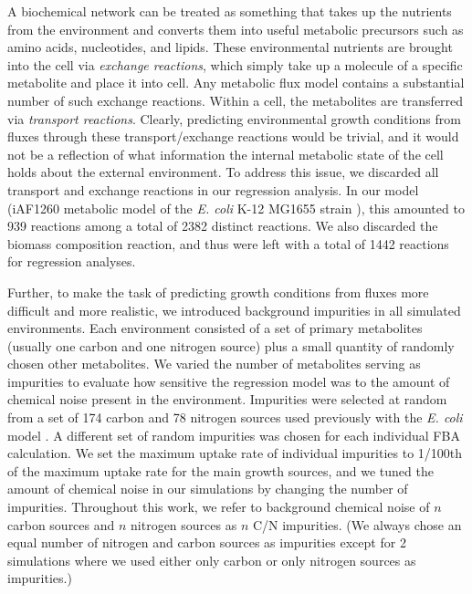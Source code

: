 \documentclass[12pt]{article}
\begin{document}
A biochemical network can be treated as something that takes up the nutrients from the environment and converts them into useful metabolic precursors such as amino acids, nucleotides, and lipids. These environmental nutrients are brought into the cell via \emph{exchange reactions}, which simply take up a molecule of a specific metabolite and place it into cell. Any metabolic flux model contains a substantial number of such exchange reactions. Within a cell, the metabolites are transferred via \emph{transport reactions}. Clearly, predicting environmental growth conditions from fluxes through these transport/exchange reactions would be trivial, and it would not be a reflection of what information the internal metabolic state of the cell holds about the external environment. To address this issue, we discarded all transport and exchange reactions in our regression analysis. In our model (iAF1260 metabolic model of the \emph{E. coli} K-12 MG1655 strain \cite{Schellenbergeretal2010}), this amounted to 939 reactions among a total of 2382 distinct reactions. We also discarded the biomass composition reaction, and thus were left with a total of 1442 reactions for regression analyses.

Further, to make the task of predicting growth conditions from fluxes more difficult and more realistic, we introduced background impurities in all simulated environments. Each environment consisted of a set of primary metabolites (usually one carbon and one nitrogen source) plus a small quantity of randomly chosen other metabolites. We varied the number of metabolites serving as impurities to evaluate how sensitive the regression model was to the amount of chemical noise present in the environment. Impurities were selected at random from a set of 174 carbon and 78 nitrogen sources used previously with the \emph{E. coli} model \cite{Feistetal2007}. A different set of random impurities was chosen for each individual FBA calculation. We set the maximum uptake rate of individual impurities to 1/100th of the maximum uptake rate for the main growth sources, and we tuned the amount of chemical noise in our simulations by changing the number of impurities. Throughout this work, we refer to background chemical noise of $n$ carbon sources and $n$ nitrogen sources as $n$ C/N impurities. (We always chose an equal number of nitrogen and carbon sources as impurities except for 2 simulations where we used either only carbon or only nitrogen sources as impurities.)
\end{document}

